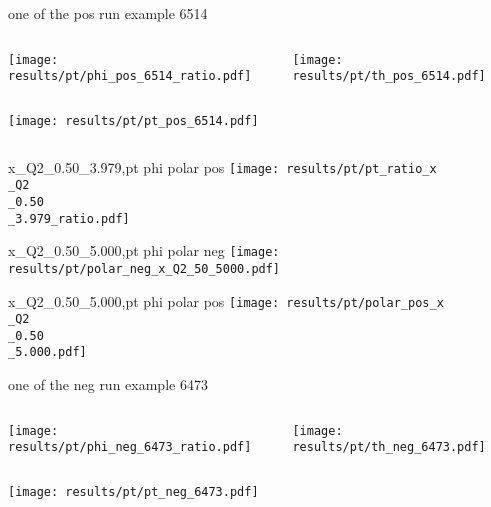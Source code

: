 \begin{frame}{one of the pos run example 6514}
\begin{columns}
\begin{column}[T]{0.5\textwidth}
\texttt{[image: results/pt/phi\_pos\_6514\_ratio.pdf]}
\end{column}
\begin{column}[T]{0.5\textwidth}
\texttt{[image: results/pt/th\_pos\_6514.pdf]}
\end{column}
\end{columns}
\begin{columns}
\begin{column}[T]{0.5\textwidth}
\texttt{[image: results/pt/pt\_pos\_6514.pdf]}
\end{column}
\begin{column}[T]{0.5\textwidth}
\end{column}
\end{columns}
\end{frame}
\begin{frame}{x\_Q2\_0.50\_3.979,pt phi polar pos}
\texttt{[image: results/pt/pt\_ratio\_x\\\_Q2\\\_0.50\\\_3.979\_ratio.pdf]}
\end{frame}
\begin{frame}{x\_Q2\_0.50\_5.000,pt phi polar neg}
\texttt{[image: results/pt/polar\_neg\_x\_Q2\_50\_5000.pdf]}
\end{frame}
\begin{frame}{x\_Q2\_0.50\_5.000,pt phi polar pos}
\texttt{[image: results/pt/polar\_pos\_x\\\_Q2\\\_0.50\\\_5.000.pdf]}
\end{frame}
\begin{frame}{one of the neg run example 6473}
\begin{columns}
\begin{column}[T]{0.5\textwidth}
\texttt{[image: results/pt/phi\_neg\_6473\_ratio.pdf]}
\end{column}
\begin{column}[T]{0.5\textwidth}
\texttt{[image: results/pt/th\_neg\_6473.pdf]}
\end{column}
\end{columns}
\texttt{[image: results/pt/pt\_neg\_6473.pdf]}
\end{frame}
